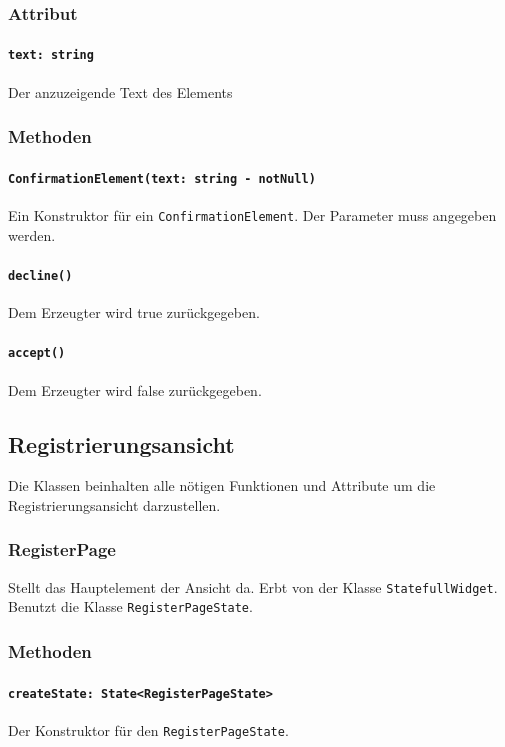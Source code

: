 \documentclass{entwurfsheft}
\begin{document}
        \subsubsection*{Attribut}
            \paragraph*{\texttt{text: string}} Der anzuzeigende Text des Elements

        \subsubsection*{Methoden}
            \paragraph*{\texttt{ConfirmationElement(text: string - notNull)}} Ein Konstruktor für ein \texttt{ConfirmationElement}. Der Parameter muss angegeben werden.
            \paragraph*{\texttt{decline()}} Dem Erzeugter wird true zurückgegeben.
            \paragraph*{\texttt{accept()}} Dem Erzeugter wird false zurückgegeben.

\subsection{Registrierungsansicht}
    Die Klassen beinhalten alle nötigen Funktionen und Attribute um die Registrierungsansicht darzustellen.

    \subsubsection{RegisterPage}
        Stellt das Hauptelement der Ansicht da. Erbt von der Klasse \texttt{StatefullWidget}. Benutzt die Klasse \texttt{RegisterPageState}.
        \subsubsection*{Methoden}
            \paragraph*{\texttt{createState: State<RegisterPageState>}} Der Konstruktor für den \texttt{RegisterPageState}.
    
\end{document}
